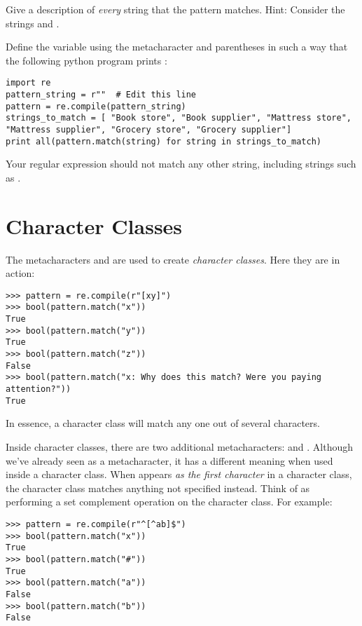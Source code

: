 \begin{problem}
Give a description of \emph{every} string that the pattern  matches. Hint: Consider the strings  and .
\end{problem}

\begin{problem}
Define the variable  using the metacharacter  and parentheses in such a way that the following python program prints :

\begin{lstlisting}
import re
pattern_string = r""  # Edit this line
pattern = re.compile(pattern_string)
strings_to_match = [ "Book store", "Book supplier", "Mattress store", "Mattress supplier", "Grocery store", "Grocery supplier"]
print all(pattern.match(string) for string in strings_to_match)
\end{lstlisting}
Your regular expression should not match any other string, including strings such as .
\end{problem}

\section*{Character Classes}
The metacharacters \li{'['} and \li{']'} are used to create \emph{character classes}.
Here they are in action:
\begin{lstlisting}
>>> pattern = re.compile(r"[xy]")
>>> bool(pattern.match("x"))
True
>>> bool(pattern.match("y"))
True
>>> bool(pattern.match("z"))
False
>>> bool(pattern.match("x: Why does this match? Were you paying attention?"))
True
\end{lstlisting}

In essence, a character class will match any one out of several characters.

Inside character classes, there are two additional metacharacters:  and .
Although we've already seen  as a metacharacter, it has a different meaning when used inside a character class.
When  appears \emph{as the first character} in a character class, the character class matches anything not specified instead.
Think of  as performing a set complement operation on the character class.
For example:
\begin{lstlisting}
>>> pattern = re.compile(r"^[^ab]$")
>>> bool(pattern.match("x"))
True
>>> bool(pattern.match("#"))
True
>>> bool(pattern.match("a"))
False
>>> bool(pattern.match("b"))
False
\end{lstlisting}

